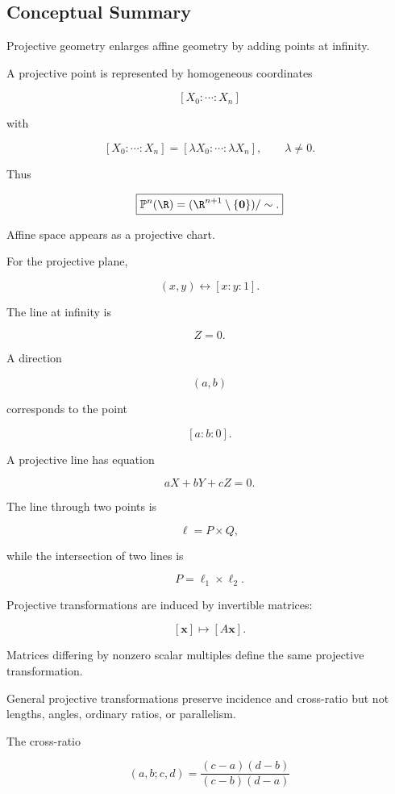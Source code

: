 \subsection{Conceptual Summary}
\label{subsec:projective-summary}

Projective geometry enlarges affine geometry by adding points at infinity.

A projective point is represented by homogeneous coordinates

\[
\boxed{
[X_0:\cdots:X_n]
}
\]

with

\[
[X_0:\cdots:X_n]
=
[\lambda X_0:\cdots:\lambda X_n],
\qquad
\lambda\neq0.
\]

Thus

\[
\boxed{
\mathbb{P}^{n}(\R)
=
(\R^{n+1}\setminus\{\mathbf{0}\})/\sim.
}
\]

Affine space appears as a projective chart.

For the projective plane,

\[
(x,y)
\longleftrightarrow
[x:y:1].
\]

The line at infinity is

\[
\boxed{Z=0.}
\]

A direction

\[
(a,b)
\]

corresponds to the point

\[
\boxed{[a:b:0].}
\]

A projective line has equation

\[
\boxed{
aX+bY+cZ=0.
}
\]

The line through two points is

\[
\boxed{\ell=P\times Q,}
\]

while the intersection of two lines is

\[
\boxed{P=\ell_1\times\ell_2.}
\]

Projective transformations are induced by invertible matrices:

\[
\boxed{
[\mathbf{x}]
\mapsto
[A\mathbf{x}].
}
\]

Matrices differing by nonzero scalar multiples define the same projective
transformation.

General projective transformations preserve incidence and cross-ratio but
not lengths, angles, ordinary ratios, or parallelism.

The cross-ratio

\[
\boxed{
(a,b;c,d)
=
\frac{(c-a)(d-b)}
     {(c-b)(d-a)}
}
\]

